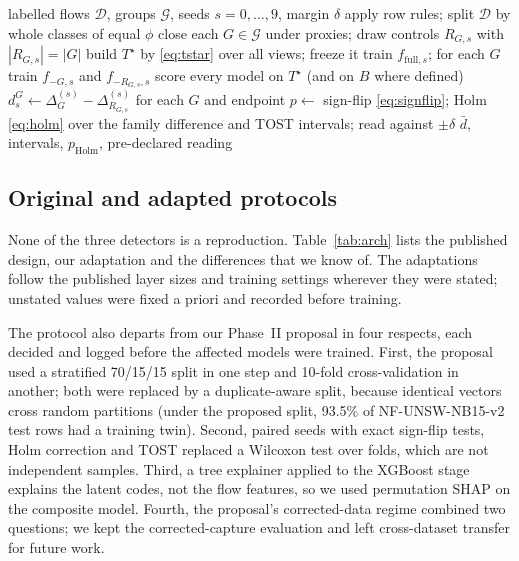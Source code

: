 \documentclass[journal]{IEEEtran}
\newcommand{\Tstar}{T^{\star}}
\begin{document}
\begin{algorithm}[t]
\caption{Feature-reliance audit for one design}
\label{alg:audit}
\begin{algorithmic}[1]
\Require labelled flows $\mathcal{D}$, groups $\mathcal{G}$, seeds $s=0,\dots,9$, margin $\delta$
\State apply row rules; split $\mathcal{D}$ by whole classes of equal $\phi$
\State close each $G\in\mathcal{G}$ under proxies; draw controls $R_{G,s}$ with $|R_{G,s}|=|G|$
\State build $\Tstar$ by \eqref{eq:tstar} over all views; freeze it
  \State train $f_{\mathrm{full},s}$; for each $G$ train $f_{-G,s}$ and $f_{-R_{G,s},s}$
  \State score every model on $\Tstar$ (and on $B$ where defined)
  \State $d_s^{G}\gets\Delta_G^{(s)}-\Delta_{R_{G,s}}^{(s)}$ for each $G$ and endpoint
\EndFor
\State $p\gets$ sign-flip \eqref{eq:signflip}; Holm \eqref{eq:holm} over the family
\State difference and TOST intervals; read against $\pm\delta$
\State \Return $\bar d$, intervals, $p_{\mathrm{Holm}}$, pre-declared reading
\end{algorithmic}
\end{algorithm}

\subsection{Original and adapted protocols}
None of the three detectors is a reproduction. Table~\ref{tab:arch} lists the published design,
our adaptation and the differences that we know of. The adaptations follow the published layer
sizes and training settings wherever they were stated; unstated values were fixed a priori and
recorded before training.

The protocol also departs from our Phase~II proposal in four respects, each decided and logged
before the affected models were trained. First, the proposal used a stratified 70/15/15 split in
one step and 10-fold cross-validation in another; both were replaced by a duplicate-aware split,
because identical vectors cross random partitions (under the proposed split, 93.5\% of
NF-UNSW-NB15-v2 test rows had a training twin). %
Second, paired seeds with exact sign-flip tests, Holm correction and TOST replaced a Wilcoxon test
over folds, which are not independent samples. Third, a tree explainer applied to the XGBoost stage
explains the latent codes, not the flow features, so we used permutation SHAP on the composite
model. Fourth, the proposal's corrected-data regime combined two questions; we kept the
corrected-capture evaluation and left cross-dataset transfer for future work.
\end{document}
